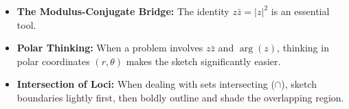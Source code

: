 \begin{solution}[Sketch]
\end{solution}

\begin{takeaways}

\begin{itemize}[leftmargin=*]
    \item \textbf{The Modulus-Conjugate Bridge:} The identity $z\bar{z} = |z|^2$ is an essential tool.
    \item \textbf{Polar Thinking:} When a problem involves $z\bar{z}$ and $\arg(z)$, thinking in polar coordinates $(r, \theta)$ makes the sketch significantly easier.
    \item \textbf{Intersection of Loci:} When dealing with sets intersecting ($\cap$), sketch boundaries lightly first, then boldly outline and shade the overlapping region.
\end{itemize}
  
\end{takeaways}

